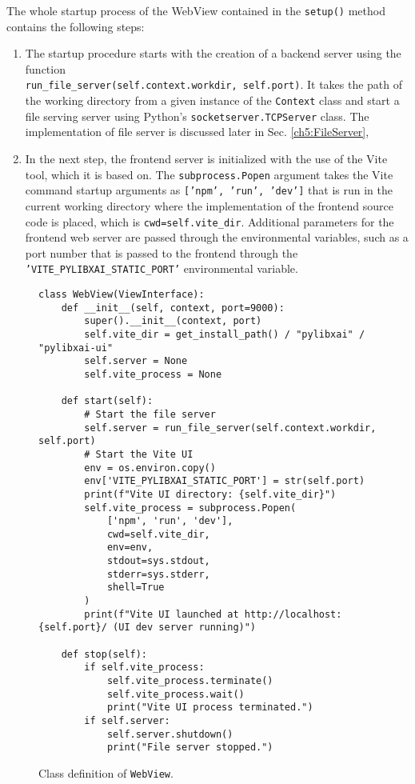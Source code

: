 \documentclass[
    bindingoffset=5mm,  %
    footnoteindent=3mm, %
    hyphenation=true    %
]{src/wut-thesis}
\begin{document}
The whole startup process of the WebView contained in the \texttt{setup()} method contains the following steps:
\begin{enumerate}
    \item The startup procedure starts with the creation of a backend server using the function  \\
        \texttt{run_file_server(self.context.workdir, self.port)}.
        It takes the path of \\ the working directory from a given instance of the \texttt{Context} class
        and start a file serving server using Python's \texttt{socketserver.TCPServer} class.
        The implementation of file server is discussed later in Sec. \ref{ch5:FileServer},
    \item In the next step, the frontend server is initialized with the use of the Vite \cite{ViteDOC} tool,
        which it is based on. The \texttt{subprocess.Popen} argument takes the
        Vite command startup arguments as \texttt{['npm', 'run', 'dev']} that is run in the current working directory where the implementation of the frontend source code is placed, which is \texttt{cwd=self.vite_dir}. Additional parameters for the frontend web server are passed through the environmental variables, such as a port number that is passed to the frontend through the \texttt{'VITE_PYLIBXAI_STATIC_PORT'} environmental variable.
    
\end{enumerate}

\begin{figure}%
\begin{verbatim}
class WebView(ViewInterface):
    def __init__(self, context, port=9000):
        super().__init__(context, port)
        self.vite_dir = get_install_path() / "pylibxai" / "pylibxai-ui"
        self.server = None
        self.vite_process = None

    def start(self):
        # Start the file server
        self.server = run_file_server(self.context.workdir, self.port)
        # Start the Vite UI
        env = os.environ.copy()
        env['VITE_PYLIBXAI_STATIC_PORT'] = str(self.port)
        print(f"Vite UI directory: {self.vite_dir}")
        self.vite_process = subprocess.Popen(
            ['npm', 'run', 'dev'],
            cwd=self.vite_dir,
            env=env,
            stdout=sys.stdout,
            stderr=sys.stderr,
            shell=True
        )
        print(f"Vite UI launched at http://localhost:{self.port}/ (UI dev server running)")

    def stop(self):
        if self.vite_process:
            self.vite_process.terminate()
            self.vite_process.wait()
            print("Vite UI process terminated.")
        if self.server:
            self.server.shutdown()
            print("File server stopped.")
\end{verbatim}
\caption{Class definition of \texttt{WebView}.}
\label{fig:WebView}
\end{figure}
 
\end{document}
